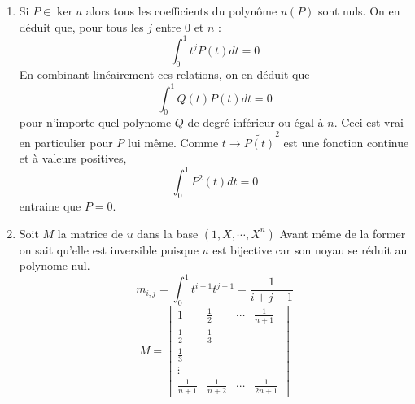 \begin{enumerate}
 \item Si $P\in \ker u$ alors tous les coefficients du polynôme $u(P)$ sont nuls. On en déduit que, pour tous les $j$ entre 0 et $n$ :
\[\int_0^1t^jP(t)dt=0\]
En combinant linéairement ces relations, on en déduit que
\[\int_0^1Q(t)P(t)dt=0\]
pour n'importe quel polynome $Q$ de degré inférieur ou égal à $n$. Ceci est vrai en particulier pour $P$ lui même. Comme $t\rightarrow \tilde{P(t)}^2$ est une fonction continue et à valeurs positives,
\[\int_0^1P^2(t)dt=0\]
entraine que $P=0$.
\item Soit $M$ la matrice de $u$ dans la base $(1,X,\cdots,X^n)$  Avant même de la former on sait qu'elle est inversible puisque $u$ est bijective car son noyau se réduit au polynome nul.
\[m_{i,j}=\int_0^1t^{i-1}t^{j-1}=\frac{1}{i+j-1}\]
\[ M= \left[ 
\begin{array}{cccc}
1            & \frac{1}{2} & \cdots & \frac{1}{n+1} \\
\frac{1}{2}  & \frac{1}{3} &        & \\
\frac{1}{3}  &             &        & \\
\vdots       &             &        & \\
\frac{1}{n+1}&\frac{1}{n+2}&\cdots  & \frac{1}{2n+1}
\end{array}
\right] 
\]
\end{enumerate}

